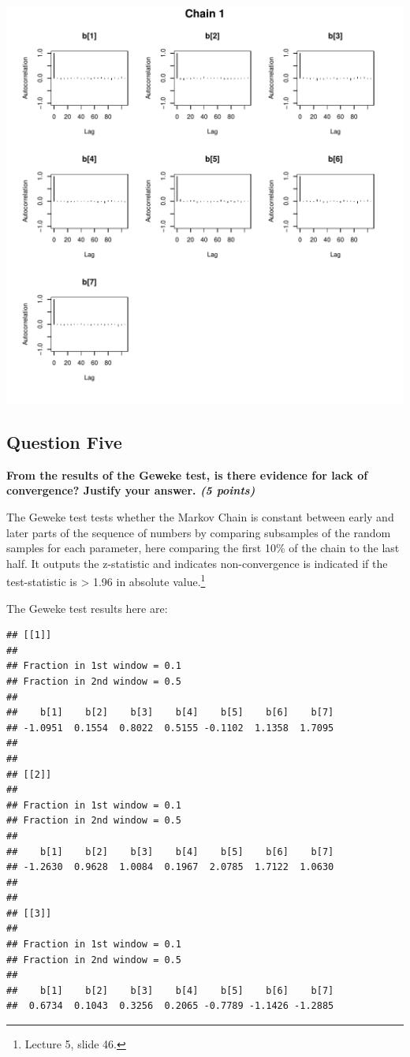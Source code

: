 \documentclass[
  11pt,
]{article}
\begin{document}
\includegraphics{ACF_LogisticReg.pdf}

\pagebreak

\hypertarget{question-five}{%
\subsection{Question Five}\label{question-five}}

\textbf{From the results of the Geweke test, is there evidence for lack of convergence? Justify your answer. \textit{(5 points)}}

The Geweke test tests whether the Markov Chain is constant between early
and later parts of the sequence of numbers by comparing subsamples of
the random samples for each parameter, here comparing the first 10\% of
the chain to the last half. It outputs the z-statistic and indicates
non-convergence is indicated if the test-statistic is \textgreater{}
1.96 in absolute value.\footnote{Lecture 5, slide 46.}

The Geweke test results here are:

\begin{verbatim}
## [[1]]
## 
## Fraction in 1st window = 0.1
## Fraction in 2nd window = 0.5 
## 
##    b[1]    b[2]    b[3]    b[4]    b[5]    b[6]    b[7] 
## -1.0951  0.1554  0.8022  0.5155 -0.1102  1.1358  1.7095 
## 
## 
## [[2]]
## 
## Fraction in 1st window = 0.1
## Fraction in 2nd window = 0.5 
## 
##    b[1]    b[2]    b[3]    b[4]    b[5]    b[6]    b[7] 
## -1.2630  0.9628  1.0084  0.1967  2.0785  1.7122  1.0630 
## 
## 
## [[3]]
## 
## Fraction in 1st window = 0.1
## Fraction in 2nd window = 0.5 
## 
##    b[1]    b[2]    b[3]    b[4]    b[5]    b[6]    b[7] 
##  0.6734  0.1043  0.3256  0.2065 -0.7789 -1.1426 -1.2885
\end{verbatim}
\end{document}
